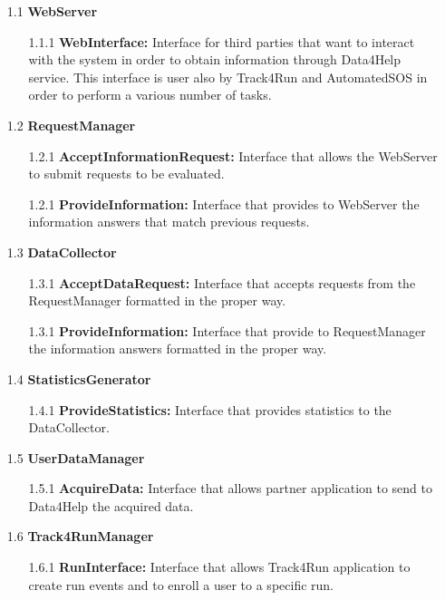 \begin{enumerate}
\item[1.1] \textbf{WebServer}
	\begin{enumerate}
		\item[1.1.1] \textbf{WebInterface:} Interface for third parties that want to interact with the system in order to obtain information through Data4Help service. This interface is user also by Track4Run and AutomatedSOS in order to perform a various number of tasks.
	\end{enumerate}
	
\item[1.2] \textbf{RequestManager}
	\begin{enumerate}
		\item[1.2.1] \textbf{AcceptInformationRequest:} Interface that allows the WebServer to submit requests to be evaluated.
		\item[1.2.1] \textbf{ProvideInformation:} Interface that provides to WebServer the information answers that match previous requests.
	\end{enumerate}

\item[1.3] \textbf{DataCollector}
	\begin{enumerate}
		\item[1.3.1] \textbf{AcceptDataRequest:} Interface that accepts requests from the RequestManager formatted in the proper way.
		\item[1.3.1] \textbf{ProvideInformation:} Interface that provide to RequestManager the information answers formatted in the proper way.
	\end{enumerate}
	
\item[1.4] \textbf{StatisticsGenerator}
	\begin{enumerate}
		\item[1.4.1] \textbf{ProvideStatistics:} Interface that provides statistics to the DataCollector.
	\end{enumerate}
	
\item[1.5] \textbf{UserDataManager}
	\begin{enumerate}
		\item[1.5.1] \textbf{AcquireData:} Interface that allows partner application to send to Data4Help the acquired data.
	\end{enumerate}

\item[1.6] \textbf{Track4RunManager}
	\begin{enumerate}
		\item[1.6.1] \textbf{RunInterface:} Interface that allows Track4Run application to create run events and to enroll a user to a specific run. 
	\end{enumerate}
	

\end{enumerate}
